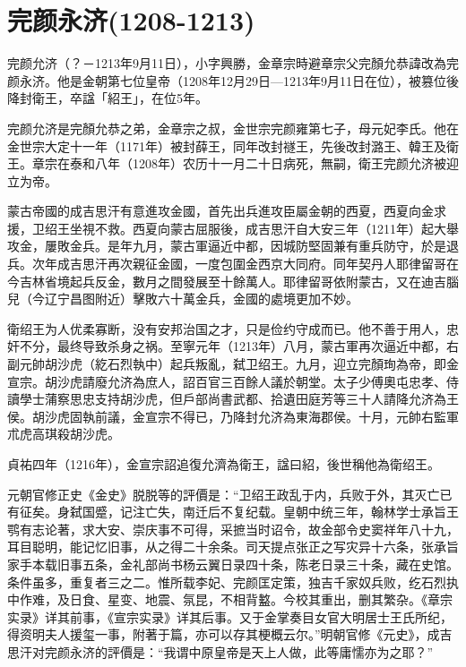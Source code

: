 
\section{完颜永济\tiny(1208-1213)}

完颜允济（？－1213年9月11日），小字興勝，金章宗時避章宗父完顏允恭諱改為完颜永济。他是金朝第七位皇帝（1208年12月29日—1213年9月11日在位），被篡位後降封衛王，卒諡「紹王」，在位5年。

完颜允济是完顏允恭之弟，金章宗之叔，金世宗完颜雍第七子，母元妃李氏。他在金世宗大定十一年（1171年）被封薛王，同年改封禭王，先後改封潞王、韓王及衛王。章宗在泰和八年（1208年）农历十一月二十日病死，無嗣，衛王完颜允济被迎立为帝。

蒙古帝國的成吉思汗有意進攻金國，首先出兵進攻臣屬金朝的西夏，西夏向金求援，卫绍王坐視不救。西夏向蒙古屈服後，成吉思汗自大安三年（1211年）起大舉攻金，屢敗金兵。是年九月，蒙古軍逼近中都，因城防堅固兼有重兵防守，於是退兵。次年成吉思汗再次親征金國，一度包圍金西京大同府。同年契丹人耶律留哥在今吉林省境起兵反金，數月之間發展至十餘萬人。耶律留哥依附蒙古，又在迪吉腦兒（今辽宁昌图附近）擊敗六十萬金兵，金國的處境更加不妙。

衛绍王为人优柔寡断，没有安邦治国之才，只是俭约守成而已。他不善于用人，忠奸不分，最终导致杀身之祸。至寧元年（1213年）八月，蒙古軍再次逼近中都，右副元帥胡沙虎（紇石烈執中）起兵叛亂，弑卫绍王。九月，迎立完顏珣為帝，即金宣宗。胡沙虎請廢允济為庶人，詔百官三百餘人議於朝堂。太子少傅奧屯忠孝、侍讀學士蒲察思忠支持胡沙虎，但戶部尚書武都、拾遺田庭芳等三十人請降允济為王侯。胡沙虎固執前議，金宣宗不得已，乃降封允济為東海郡侯。十月，元帥右監軍朮虎高琪殺胡沙虎。

貞祐四年（1216年），金宣宗詔追復允濟為衛王，諡曰紹，後世稱他為衛绍王。

元朝官修正史《金史》脱脱等的評價是：“卫绍王政乱于内，兵败于外，其灭亡已有征矣。身弑国蹙，记注亡失，南迁后不复纪载。皇朝中统三年，翰林学士承旨王鹗有志论著，求大安、崇庆事不可得，采摭当时诏令，故金部令史窦祥年八十九，耳目聪明，能记忆旧事，从之得二十余条。司天提点张正之写灾异十六条，张承旨家手本载旧事五条，金礼部尚书杨云翼日录四十条，陈老日录三十条，藏在史馆。条件虽多，重复者三之二。惟所载李妃、完颜匡定策，独吉千家奴兵败，纥石烈执中作难，及日食、星变、地震、氛昆，不相背盭。今校其重出，删其繁杂。《章宗实录》详其前事，《宣宗实录》详其后事。又于金掌奏目女官大明居士王氏所纪，得资明夫人援玺一事，附著于篇，亦可以存其梗概云尔。”明朝官修《元史》，成吉思汗对完颜永济的評價是：“我谓中原皇帝是天上人做，此等庸懦亦为之耶？”

